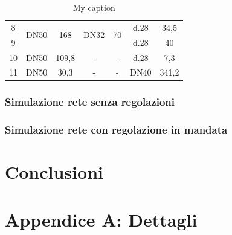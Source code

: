 \documentclass[laurea,oneside,11pt]{USiena_tesiLM}
\begin{document}
\begin{table}[]
{\begin{tabular}{|c|c|c|c|c|c|c|}
8                                             & \multirow{2}{*}{DN50} & \multirow{2}{*}{168}                   & \multirow{2}{*}{DN32}     & \multirow{2}{*}{70}   & d.28         & 34,5                      \\ \cline{1-1} \cline{6-7} 
9                                             &                       &                                        &                           &                       & d.28         & 40                        \\ \hline
10                                            & DN50                  & 109,8                                  & -                         & -                     & d.28         & 7,3                       \\ \hline
11                                            & DN50                  & 30,3                                   & -                         & -                     & DN40         & 341,2                     \\ \hline
\end{tabular}}
\caption{My caption}
\label{tab:rete_ippolito}
\end{table}


\subsection{Simulazione rete senza regolazioni}

\subsection{Simulazione rete con regolazione in mandata}



\chapter{Conclusioni}


\backmatter

\appendix
\chapter{Appendice A: Dettagli}
%


%



%

\end{document}
